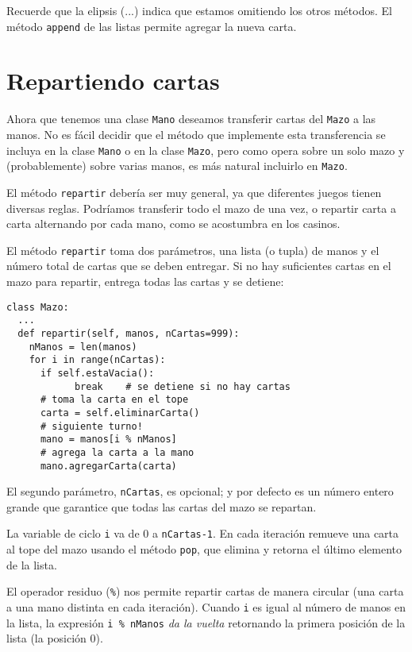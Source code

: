 Recuerde que la elipsis (...) indica que estamos omitiendo los otros
métodos. El método \texttt{append} de las listas permite agregar la
nueva carta.

\section{Repartiendo cartas}


Ahora que tenemos una clase \texttt{Mano} deseamos transferir cartas
del \texttt{Mazo} a las manos. No es fácil decidir que el método que
implemente esta transferencia se incluya en la clase \texttt{Mano}
o en la clase \texttt{Mazo}, pero como opera sobre un solo mazo y
(probablemente) sobre varias manos, es más natural incluirlo en \texttt{Mazo}.

El método \texttt{repartir} debería ser muy general, ya que diferentes
juegos tienen diversas reglas. Podríamos transferir todo el mazo de
una vez, o repartir carta a carta alternando por cada mano, como se
acostumbra en los casinos.

El método \texttt{repartir} toma dos parámetros, una lista (o tupla)
de manos y el número total de cartas que se deben entregar. Si no
hay suficientes cartas en el mazo para repartir, entrega todas las
cartas y se detiene:

\begin{verbatim}
class Mazo:
  ...
  def repartir(self, manos, nCartas=999):
    nManos = len(manos)
    for i in range(nCartas):
      if self.estaVacia(): 
            break    # se detiene si no hay cartas
      # toma la carta en el tope
      carta = self.eliminarCarta() 
      # siguiente turno!
      mano = manos[i % nManos] 
      # agrega la carta a la mano
      mano.agregarCarta(carta) 
\end{verbatim}
 El segundo parámetro, \texttt{nCartas}, es opcional; y por defecto
es un número entero grande que garantice que todas las cartas del
mazo se repartan.

 

La variable de ciclo \texttt{i} va de 0 a \texttt{nCartas-1}. En cada
iteración remueve una carta al tope del mazo usando el método \texttt{pop},
que elimina y retorna el último elemento de la lista.

 

El operador residuo (\texttt{\%}) nos permite repartir cartas de manera
circular (una carta a una mano distinta en cada iteración). Cuando
\texttt{i} es igual al número de manos en la lista, la expresión \texttt{i
\% nManos} \textit{da la vuelta} retornando la primera posición de
la lista (la posición 0).


